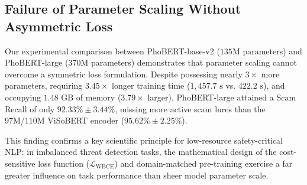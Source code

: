 \subsection{Failure of Parameter Scaling Without Asymmetric Loss}
Our experimental comparison between PhoBERT-base-v2 ($135\text{M}$ parameters) and PhoBERT-large ($370\text{M}$ parameters) demonstrates that parameter scaling cannot overcome a symmetric loss formulation. Despite possessing nearly $3\times$ more parameters, requiring $3.45\times$ longer training time ($1,457.7\text{ s}$ vs. $422.2\text{ s}$), and occupying $1.48\text{ GB}$ of memory ($3.79\times$ larger), PhoBERT-large attained a Scam Recall of only $92.33\% \pm 3.44\%$, missing more active scam lures than the 97M/110M ViSoBERT encoder ($95.62\% \pm 2.25\%$).

This finding confirms a key scientific principle for low-resource safety-critical NLP: in imbalanced threat detection tasks, the mathematical design of the cost-sensitive loss function ($\mathcal{L}_{\text{WBCE}}$) and domain-matched pre-training exercise a far greater influence on task performance than sheer model parameter scale.
